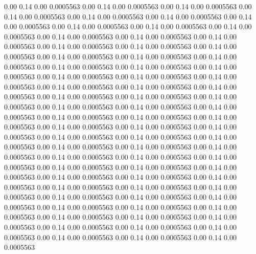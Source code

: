    0.00    0.14    0.00   0.0005563
   0.00    0.14    0.00   0.0005563
   0.00    0.14    0.00   0.0005563
   0.00    0.14    0.00   0.0005563
   0.00    0.14    0.00   0.0005563
   0.00    0.14    0.00   0.0005563
   0.00    0.14    0.00   0.0005563
   0.00    0.14    0.00   0.0005563
   0.00    0.14    0.00   0.0005563
   0.00    0.14    0.00   0.0005563
   0.00    0.14    0.00   0.0005563
   0.00    0.14    0.00   0.0005563
   0.00    0.14    0.00   0.0005563
   0.00    0.14    0.00   0.0005563
   0.00    0.14    0.00   0.0005563
   0.00    0.14    0.00   0.0005563
   0.00    0.14    0.00   0.0005563
   0.00    0.14    0.00   0.0005563
   0.00    0.14    0.00   0.0005563
   0.00    0.14    0.00   0.0005563
   0.00    0.14    0.00   0.0005563
   0.00    0.14    0.00   0.0005563
   0.00    0.14    0.00   0.0005563
   0.00    0.14    0.00   0.0005563
   0.00    0.14    0.00   0.0005563
   0.00    0.14    0.00   0.0005563
   0.00    0.14    0.00   0.0005563
   0.00    0.14    0.00   0.0005563
   0.00    0.14    0.00   0.0005563
   0.00    0.14    0.00   0.0005563
   0.00    0.14    0.00   0.0005563
   0.00    0.14    0.00   0.0005563
   0.00    0.14    0.00   0.0005563
   0.00    0.14    0.00   0.0005563
   0.00    0.14    0.00   0.0005563
   0.00    0.14    0.00   0.0005563
   0.00    0.14    0.00   0.0005563
   0.00    0.14    0.00   0.0005563
   0.00    0.14    0.00   0.0005563
   0.00    0.14    0.00   0.0005563
   0.00    0.14    0.00   0.0005563
   0.00    0.14    0.00   0.0005563
   0.00    0.14    0.00   0.0005563
   0.00    0.14    0.00   0.0005563
   0.00    0.14    0.00   0.0005563
   0.00    0.14    0.00   0.0005563
   0.00    0.14    0.00   0.0005563
   0.00    0.14    0.00   0.0005563
   0.00    0.14    0.00   0.0005563
   0.00    0.14    0.00   0.0005563
   0.00    0.14    0.00   0.0005563
   0.00    0.14    0.00   0.0005563
   0.00    0.14    0.00   0.0005563
   0.00    0.14    0.00   0.0005563
   0.00    0.14    0.00   0.0005563
   0.00    0.14    0.00   0.0005563
   0.00    0.14    0.00   0.0005563
   0.00    0.14    0.00   0.0005563
   0.00    0.14    0.00   0.0005563
   0.00    0.14    0.00   0.0005563
   0.00    0.14    0.00   0.0005563
   0.00    0.14    0.00   0.0005563
   0.00    0.14    0.00   0.0005563
   0.00    0.14    0.00   0.0005563
   0.00    0.14    0.00   0.0005563
   0.00    0.14    0.00   0.0005563
   0.00    0.14    0.00   0.0005563
   0.00    0.14    0.00   0.0005563
   0.00    0.14    0.00   0.0005563
   0.00    0.14    0.00   0.0005563
   0.00    0.14    0.00   0.0005563
   0.00    0.14    0.00   0.0005563
   0.00    0.14    0.00   0.0005563

